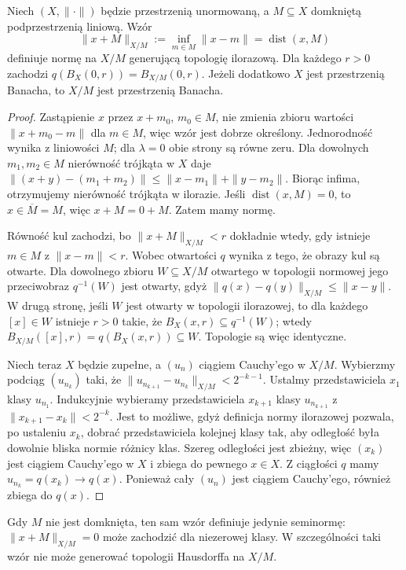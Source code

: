 \begin{twierdzenie}\label{thm:quotient-norm}
Niech $(X,\|\cdot\|)$ będzie przestrzenią unormowaną,
a $M\subseteq X$ domkniętą podprzestrzenią liniową. Wzór
\[
 \|x+M\|_{X/M}:=\inf_{m\in M}\|x-m\|=\operatorname{dist}(x,M)
\]
definiuje normę na $X/M$ generującą topologię ilorazową.
Dla każdego $r>0$ zachodzi
$q(B_X(0,r))=B_{X/M}(0,r)$.
Jeżeli dodatkowo $X$ jest przestrzenią Banacha,
to $X/M$ jest przestrzenią Banacha.
\end{twierdzenie}
\begin{proof}
Zastąpienie $x$ przez $x+m_0$, $m_0\in M$, nie zmienia
zbioru wartości $\|x+m_0-m\|$ dla $m\in M$, więc wzór
jest dobrze określony. Jednorodność wynika z liniowości $M$;
dla $\lambda=0$ obie strony są równe zeru. Dla dowolnych
$m_1,m_2\in M$ nierówność trójkąta w $X$ daje
$\|(x+y)-(m_1+m_2)\|\leq\|x-m_1\|+\|y-m_2\|$.
Biorąc infima, otrzymujemy nierówność trójkąta w ilorazie.
Jeśli $\operatorname{dist}(x,M)=0$, to $x\in\overline M=M$,
więc $x+M=0+M$. Zatem mamy normę.

Równość kul zachodzi, bo $\|x+M\|_{X/M}<r$ dokładnie
wtedy, gdy istnieje $m\in M$ z $\|x-m\|<r$.
Wobec otwartości $q$ wynika z tego, że obrazy kul
są otwarte. Dla dowolnego zbioru $W\subseteq X/M$
otwartego w topologii normowej jego przeciwobraz
$q^{-1}(W)$ jest otwarty, gdyż
$\|q(x)-q(y)\|_{X/M}\leq\|x-y\|$.
W drugą stronę, jeśli $W$ jest otwarty w topologii ilorazowej,
to dla każdego $[x]\in W$ istnieje $r>0$ takie, że
$B_X(x,r)\subseteq q^{-1}(W)$; wtedy
$B_{X/M}([x],r)=q(B_X(x,r))\subseteq W$.
Topologie są więc identyczne.

Niech teraz $X$ będzie zupełne, a $(u_n)$ ciągiem Cauchy'ego
w $X/M$. Wybierzmy podciąg $(u_{n_k})$ taki, że
$\|u_{n_{k+1}}-u_{n_k}\|_{X/M}<2^{-k-1}$.
Ustalmy przedstawiciela $x_1$ klasy $u_{n_1}$.
Indukcyjnie wybieramy przedstawiciela $x_{k+1}$ klasy
$u_{n_{k+1}}$ z $\|x_{k+1}-x_k\|<2^{-k}$.
Jest to możliwe, gdyż definicja normy ilorazowej
pozwala, po ustaleniu $x_k$, dobrać przedstawiciela
kolejnej klasy tak, aby odległość była dowolnie bliska
normie różnicy klas. Szereg odległości jest zbieżny,
więc $(x_k)$ jest ciągiem Cauchy'ego w $X$ i zbiega
do pewnego $x\in X$. Z ciągłości $q$ mamy
$u_{n_k}=q(x_k)\to q(x)$. Ponieważ cały $(u_n)$
jest ciągiem Cauchy'ego, również zbiega do $q(x)$.
\end{proof}

\begin{uwaga}
Gdy $M$ nie jest domknięta, ten sam wzór definiuje
jedynie seminormę: $\|x+M\|_{X/M}=0$ może zachodzić
dla niezerowej klasy. W szczególności taki wzór nie
może generować topologii Hausdorffa na $X/M$.
\end{uwaga}

